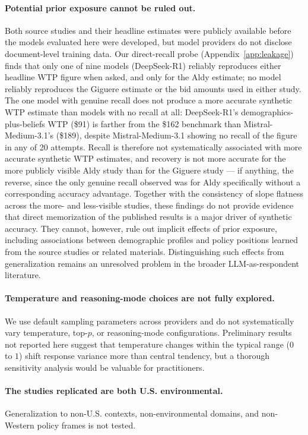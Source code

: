 \documentclass[12pt]{article}
\begin{document}
\paragraph{Potential prior exposure cannot be ruled out.}
Both source studies and their headline estimates were publicly available
before the models evaluated here were developed, but model providers do
not disclose document-level training data. Our direct-recall probe
(Appendix~\ref{app:leakage}) finds that only one of nine models
(DeepSeek-R1) reliably reproduces either headline WTP figure when asked,
and only for the Aldy estimate; no model reliably reproduces the Giguere
estimate or the bid amounts used in either study. The one model with
genuine recall does not produce a more accurate synthetic WTP estimate
than models with no recall at all: DeepSeek-R1's demographics-plus-beliefs
WTP (\$91) is farther from the \$162 benchmark than Mistral-Medium-3.1's
(\$189), despite Mistral-Medium-3.1 showing no recall of the figure in
any of 20 attempts. Recall is therefore not systematically associated
with more accurate synthetic WTP estimates, and recovery is not more
accurate for the more publicly visible Aldy study than for the Giguere
study --- if anything, the reverse, since the only genuine recall observed
was for Aldy specifically without a corresponding accuracy advantage.
Together with the consistency of slope flatness across the more- and
less-visible studies, these findings do not provide evidence that direct
memorization of the published results is a major driver of synthetic
accuracy. They cannot, however, rule out implicit effects of prior exposure,
including associations between demographic profiles and policy positions
learned from the source studies or related materials. Distinguishing such
effects from generalization remains an unresolved problem in the broader
LLM-as-respondent literature.

\paragraph{Temperature and reasoning-mode choices are not fully
explored.} We use default sampling parameters across providers and do
not systematically vary temperature, top-$p$, or reasoning-mode
configurations. Preliminary results not reported here suggest that
temperature changes within the typical range ($0$ to $1$) shift response
variance more than central tendency, but a thorough sensitivity analysis
would be valuable for practitioners.

\paragraph{The studies replicated are both U.S. environmental.}
Generalization to non-U.S. contexts, non-environmental domains, and
non-Western policy frames is not tested.
\end{document}
